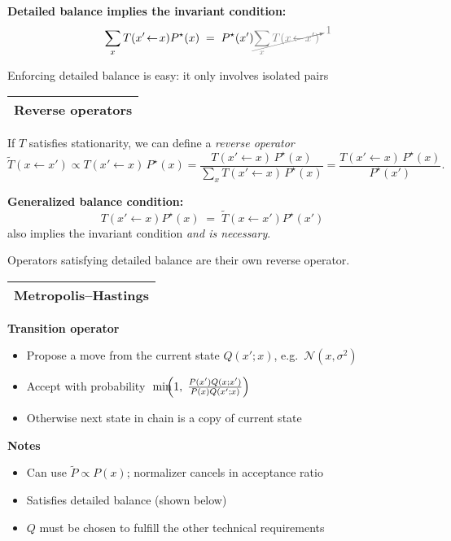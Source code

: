 \documentclass[25pt,landscape]{foils}
\newcommand{\Gray}{\textcolor{mygray}}
\newcommand{\LightGray}{\textcolor{mylightgray}}
\newcommand{\Green}{\textcolor{mypine}}
\newcommand{\myfoilhead}[1]{
\newpage
\vspace*{-1cm}
\Gray{
\begin{tabular*}{\textwidth}{l}
{\bf \Huge #1} \\
\bottomrule
\end{tabular*}}}
\newcommand{\N}{\mathcal{N}}
\newcommand{\la}{\!\leftarrow\!}
\begin{document}
\vfill

\Green{\bf Detailed balance implies the invariant condition:}\\[-0.2in]
\[
\sum_x T(x'\la x) P^\star(x) \;=\; P^\star(x') \LightGray{\cancelto{1}{\sum_x T(x\la x')}}
\]%

\bigskip
Enforcing detailed balance is easy: it only involves isolated pairs

\vspace*{-0.5cm}

\myfoilhead{Reverse operators}

\vfill

\newcommand{\tT}{\widetilde{T}}
\newcommand{\sd}{P^\star}

If $T$ satisfies stationarity, we can define a \emph{reverse operator}
\[
    \tT(x\la x') \propto T(x'\la x)\,\sd(x) =
        \frac{T(x'\la x)\,\sd(x)}{\sum_x T(x'\la x)\,\sd(x)} =
        \frac{T(x'\la x)\,\sd(x)}{\sd(x')} .
\]

\vfill

\Green{\bf Generalized balance condition:}
\[
T(x'\la x) P^\star(x) \;=\; \tT(x\la x') P^\star(x')
\]
also implies the invariant condition \emph{and is necessary}.

\vfill

Operators satisfying detailed balance are their own reverse operator.

\myfoilhead{Metropolis--Hastings}

\vfill

\Green{\bf Transition operator}\\[-0.6in]
\begin{itemize}
    \setlength{\itemsep}{5pt}
    \setlength{\parskip}{5pt}
    \setlength{\parsep}{0cm}
\item Propose a move from the current state $Q(x';x)$, e.g.\ $\N(x,\sigma^2)$
\item Accept with probability $\kern3pt\min\kern-6pt\left(1,\; \frac{P(x')Q(x;x')}{P(x)Q(x';x)}\right)$
\item Otherwise next state in chain is a copy of current state
\end{itemize}

\bigskip

\Green{\bf Notes}\\[-0.6in]
\begin{itemize}
    \setlength{\itemsep}{5pt}
    \setlength{\parskip}{5pt}
    \setlength{\parsep}{0cm}
\item Can use $\tilde{P}\propto P(x)$; normalizer cancels in acceptance ratio
\item Satisfies detailed balance {\scriptsize (shown below)}
\item $Q$ must be chosen to fulfill the other technical requirements
\end{itemize}
\end{document}
